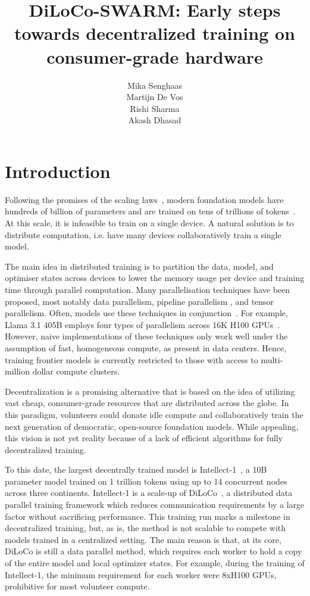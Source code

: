 \documentclass{article}
\title{DiLoCo-SWARM: Early steps towards decentralized training on consumer-grade hardware}
\author{%
  Mika Senghaas \\
  \And
  Martijn De Vos \\
  \And
  Rishi Sharma \\
  \And
  Akash Dhasad \\
}
\begin{document}
\maketitle

\begin{abstract}
\end{abstract}

\section{Introduction}

Following the promises of the scaling laws~\cite{hoffmann2022, kaplan2020},
modern foundation models have hundreds of billion of parameters and are trained
on tens of trillions of
tokens~\cite{brown2023,touvron2023,dubey2024,openai2024,chowdhery2022,geminiteam2024}.
At this scale, it is infeasible to train on a single device. A natural solution
is to distribute computation, i.e. have many devices collaboratively train a
single model.

The main idea in distributed training is to partition the data, model, and
optimiser states across devices to lower the memory usage per device and
training time through parallel computation. Many parallelisation techniques have
been proposed, most notably data parallelism, pipeline parallelism , and tensor
parallelism. Often, models use these techniques in conjunction~\cite{dubey2024,
shoeybi2020}. For example, Llama 3.1 405B employs four types of parallelism
across 16K H100 GPUs~\cite{dubey2024}. However, naive implementations of these
techniques only work well under the assumption of fast, homogeneous compute, as
present in data centers. Hence, training frontier models is currently restricted
to those with access to multi-million dollar compute clusters. 

Decentralization is a promising alternative that is based on the idea of utilizing
vast cheap, consumer-grade resources that are distributed across the globe. In this
paradigm, volunteers could donate idle compute and collaboratively train the next
generation of democratic, open-source foundation models. While appealing, this vision
is not yet reality because of a lack of efficient algorithms for fully decentralized
training.  

To this date, the largest decentrally trained model is
Intellect-1~\cite{intellect1}, a 10B parameter model trained on 1 trillion
tokens using up to 14 concurrent nodes across three continents. Intellect-1 is a
scale-up of DiLoCo~\cite{douillard2023}, a distributed data parallel training
framework which reduces communication requirements by a large factor without
sacrificing performance. This training run marks a milestone in decentralized
training, but, as is, the method is not scalable to compete with models trained
in a centralized setting. The main reason is that, at its core, DiLoCo is still
a data parallel method, which requires each worker to hold a copy of the entire 
model and local optimizer states. For example, during the training of Intellect-1,
the minimum requirement for each worker were 8xH100 GPUs, prohibitive for most 
volunteer compute. 
\end{document}
